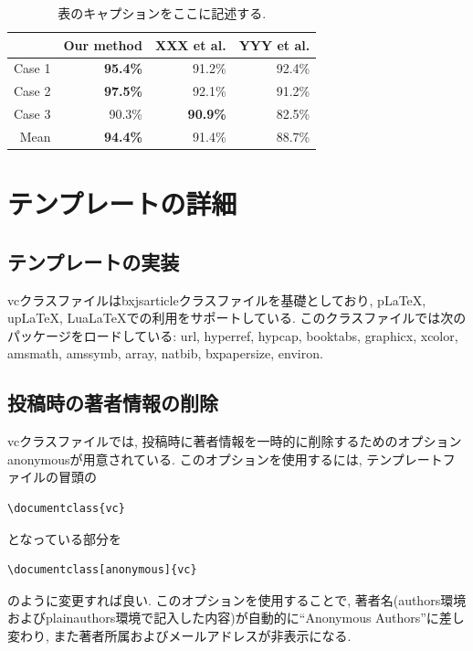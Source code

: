 \documentclass{vc}
\begin{document}
\begin{table}
  \centering
  \caption{表のキャプションをここに記述する.}
  \label{tab:accuracy}
  \begin{tabular}{@{}rrrr@{}}
    \toprule
    & Our method & XXX et al. & YYY et al. \\
    \midrule
    Case 1 & \textbf{95.4\%} &         91.2\%  & 92.4\% \\
    Case 2 & \textbf{97.5\%} &         92.1\%  & 91.2\% \\
    Case 3 &         90.3\%  & \textbf{90.9\%} & 82.5\% \\
    \midrule
    Mean   & \textbf{94.4\%} &         91.4\%  & 88.7\% \\
    \bottomrule
  \end{tabular}
\end{table}

\section{テンプレートの詳細}

\subsection{テンプレートの実装}

\textsf{vc}クラスファイルは\textsf{bxjsarticle}クラスファイルを基礎としており, pLaTeX, upLaTeX, LuaLaTeXでの利用をサポートしている.
このクラスファイルでは次のパッケージをロードしている:
\textsf{url},
\textsf{hyperref},
\textsf{hypcap},
\textsf{booktabs},
\textsf{graphicx},
\textsf{xcolor},
\textsf{amsmath},
\textsf{amssymb},
\textsf{array},
\textsf{natbib},
\textsf{bxpapersize},
\textsf{environ}.

\subsection{投稿時の著者情報の削除}

\textsf{vc}クラスファイルでは, 投稿時に著者情報を一時的に削除するためのオプション\textsf{anonymous}が用意されている.
このオプションを使用するには, テンプレートファイルの冒頭の
\begin{verbatim}
\documentclass{vc}
\end{verbatim}
となっている部分を
\begin{verbatim}
\documentclass[anonymous]{vc}
\end{verbatim}
のように変更すれば良い.
このオプションを使用することで, 著者名(\textsf{authors}環境および\textsf{plainauthors}環境で記入した内容)が自動的に``Anonymous Authors''に差し変わり, また著者所属およびメールアドレスが非表示になる.
\end{document}
